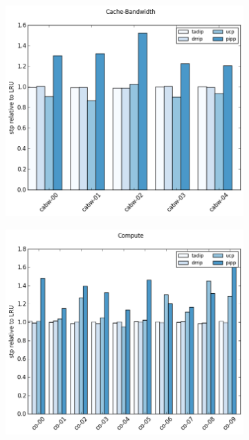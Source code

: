 \begin{figure}[ht]
\begin{subfigure}[b]{0.5\textwidth}
                \label{fig:processor_model:sensitivity:os}
        \end{subfigure}        
        \begin{subfigure}[b]{0.5\textwidth}
                \includegraphics[width=\textwidth]{../experiments/archives/02-algorithm-test/_figures/speedup/stp-cabw.png}
                \label{fig:processor_model:sensitivity:ol}
        \end{subfigure}%
        \begin{subfigure}[b]{0.5\textwidth}
                \includegraphics[width=\textwidth]{../experiments/archives/02-algorithm-test/_figures/speedup/stp-co.png}
                \label{fig:processor_model:sensitivity:os}
        \end{subfigure}
\end{figure}

